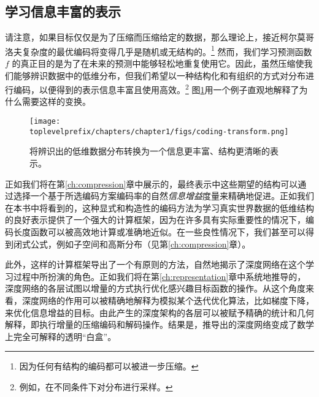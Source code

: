 \documentclass[../../book-main_zh.tex]{subfiles}
\begin{document}
\subsection{学习信息丰富的表示}
请注意，如果目标仅仅是为了压缩而压缩给定的数据，那么理论上，接近柯尔莫哥洛夫复杂度的最优编码将变得几乎是随机或无结构的\cite{Chaitin-1966}。\footnote{因为任何有结构的编码都可以被进一步压缩。} 然而，我们学习预测函数 $f$ 的真正目的是为了在未来的预测中能够轻松地重复使用它。因此，虽然压缩使我们能够辨识数据中的低维分布，但我们希望以一种结构化和有组织的方式对分布进行编码，以便得到的表示信息丰富且使用高效。\footnote{例如，在不同条件下对分布进行采样。} 图\ref{fig:expansion}用一个例子直观地解释了为什么需要这样的变换。

\begin{figure}
    \centering
    \texttt{[image: \\toplevelprefix/chapters/chapter1/figs/coding-transform.png]}
    \caption{将辨识出的低维数据分布转换为一个信息更丰富、结构更清晰的表示。}
    \label{fig:expansion}
\end{figure}
正如我们将在第\ref{ch:compression}章中展示的，最终表示中这些期望的结构可以通过选择一个基于所选编码方案编码率的自然{\em 信息增益}度量来精确地促进。正如我们在本书中将看到的，这种显式和构造性的编码方法为学习真实世界数据的低维结构的良好表示提供了一个强大的计算框架，因为在许多具有实际重要性的情况下，编码长度函数可以被高效地计算或准确地近似。在一些良性情况下，我们甚至可以得到闭式公式，例如子空间和高斯分布（见第\ref{ch:compression}章）。

此外，这样的计算框架导出了一个有原则的方法，自然地揭示了深度网络在这个学习过程中所扮演的角色。正如我们将在第\ref{ch:representation}章中系统地推导的，深度网络的各层试图以增量的方式执行优化感兴趣目标函数的操作。从这个角度来看，深度网络的作用可以被精确地解释为模拟某个迭代优化算法，比如梯度下降，来优化信息增益的目标。由此产生的深度架构的各层可以被赋予精确的统计和几何解释，即执行增量的压缩编码和解码操作。结果是，推导出的深度网络变成了数学上完全可解释的透明“白盒”。



\end{document}
